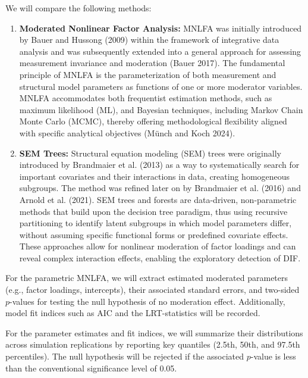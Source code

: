 \documentclass[
  man,
  floatsintext]{apa7}
\begin{document}
We will compare the following methods:

\begin{enumerate}
\def\labelenumi{\arabic{enumi})}
\item
  \textbf{Moderated Nonlinear Factor Analysis:} MNLFA was initially
  introduced by Bauer and Hussong (2009) within the framework of
  integrative data analysis and was subsequently extended into a general
  approach for assessing measurement invariance and moderation (Bauer
  2017). The fundamental principle of MNLFA is the parameterization of
  both measurement and structural model parameters as functions of one
  or more moderator variables. MNLFA accommodates both frequentist
  estimation methods, such as maximum likelihood (ML), and Bayesian
  techniques, including Markov Chain Monte Carlo (MCMC), thereby
  offering methodological flexibility aligned with specific analytical
  objectives (Münch and Koch 2024).
\item
  \textbf{SEM Trees:} Structural equation modeling (SEM) trees were
  originally introduced by Brandmaier et al. (2013) as a way to
  systematically search for important covariates and their interactions
  in data, creating homogeneous subgroups. The method was refined later
  on by Brandmaier et al. (2016) and Arnold et al. (2021). SEM trees and
  forests are data-driven, non-parametric methods that build upon the
  decision tree paradigm, thus using recursive partitioning to identify
  latent subgroups in which model parameters differ, without assuming
  specific functional forms or predefined covariate effects. These
  approaches allow for nonlinear moderation of factor loadings and can
  reveal complex interaction effects, enabling the exploratory detection
  of DIF.
\end{enumerate}

For the parametric MNLFA, we will extract estimated moderated parameters
(e.g., factor loadings, intercepts), their associated standard errors,
and two-sided \(p\)-values for testing the null hypothesis of no
moderation effect. Additionally, model fit indices such as AIC and the
LRT-statistics will be recorded.

For the parameter estimates and fit indices, we will summarize their
distributions across simulation replications by reporting key quantiles
(2.5th, 50th, and 97.5th percentiles). The null hypothesis will be
rejected if the associated \(p\)-value is less than the conventional
significance level of 0.05.
\end{document}
